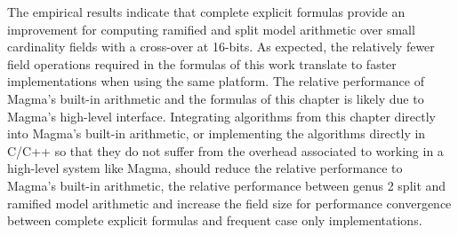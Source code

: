 The empirical results indicate that complete explicit formulas provide an
improvement for computing ramified and split model arithmetic over small
cardinality fields with a cross-over at 16-bits.  As expected, the relatively
fewer field operations required in the formulas of this work translate to faster
implementations when using the same platform. The relative performance of
Magma's built-in arithmetic and the formulas of this chapter is likely due to
Magma's high-level interface. Integrating algorithms from this chapter directly
into Magma's built-in arithmetic, or implementing the algorithms directly in
C/C++ so that they do not suffer from the overhead associated to working in a
high-level system like Magma, should reduce the relative performance to Magma's
built-in arithmetic, the relative performance between genus 2 split and ramified
model arithmetic and increase the field size for performance convergence between
complete explicit formulas and frequent case only implementations.




